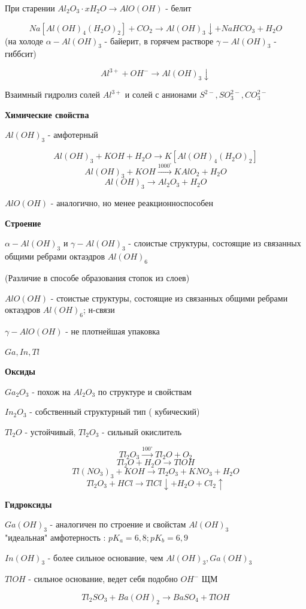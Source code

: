 \documentclass[14pt,a4paper]{scrartcl}
\begin{document}
При старении $Al_2O_3\cdot xH_2O \rightarrow AlO(OH)$ - белит

$$Na[Al(OH)_4(H_2O)_2] + CO_2 \rightarrow Al(OH)_3\downarrow + NaHCO_3 + H_2O$$
(на холоде $\alpha-Al(OH)_3$ - байерит, в горячем растворе $\gamma-Al(OH)_3$ - гиббсит)

$$Al^{3+} + OH^- \rightarrow Al(OH)_3\downarrow$$

Взаимный гидролиз солей $Al^{3+}$ и солей с анионами $S^{2-}, SO_3^{2-}, CO_3^{2-}$

\textbf{Химические свойства}

$Al(OH)_3$ - амфотерный

$$Al(OH)_3 + KOH + H_2O \rightarrow K[Al(OH)_4(H_2O)_2]$$
$$Al(OH)_3 + KOH \xrightarrow{1000^{\circ}} KAlO_2 + H_2O$$
$$Al(OH)_3 \rightarrow Al_2O_3 + H_2O$$

$AlO(OH)$ - аналогично, но менее реакционноспособен

\textbf{Строение}

$\alpha-Al(OH)_3$ и $\gamma-Al(OH)_3$ - слоистые структуры, состоящие из связанных общими ребрами октаэдров $Al(OH)_6$

(Различие в способе образования стопок из слоев)

$AlO(OH)$ - стоистые структуры, состоящие из связанных общими ребрами октаэдров $Al(OH)_6$; н-связи

$\gamma-AlO(OH)$ - не плотнейшая упаковка

$Ga, In, Tl$

\textbf{Оксиды}

$Ga_2O_3$ - похож на $Al_2O_3$ по структуре и свойствам

$In_2O_3$ - собственный структурный тип ( кубический)

$Tl_2O$ - устойчивый, $Tl_2O_3$ - сильный окислитель

$$Tl_2O_3 \xrightarrow{100^{\circ}} Tl_2O + O_2$$
$$Tl_2O + H_2O \rightarrow TlOH$$
$$Tl(NO_3)_3 + KOH \rightarrow Tl_2O_3 + KNO_3 + H_2O$$
$$Tl_2O_3 + HCl \rightarrow TlCl\downarrow + H_2O + Cl_2\uparrow$$

\textbf{Гидроксиды}

$Ga(OH)_3$ - аналогичен по строение и свойстам $Al(OH)_3$\\
"идеальная" амфотерность : $pK_a = 6,8 ; pK_b  = 6,9$

$In(OH)_3$ - более сильное основание, чем $Al(OH)_3, Ga(OH)_3$

$TlOH$ - сильное основание, ведет себя подобно $OH^-$ ЩМ

$$Tl_2SO_3 + Ba(OH)_2 \rightarrow BaSO_4 +TlOH$$
\end{document}
